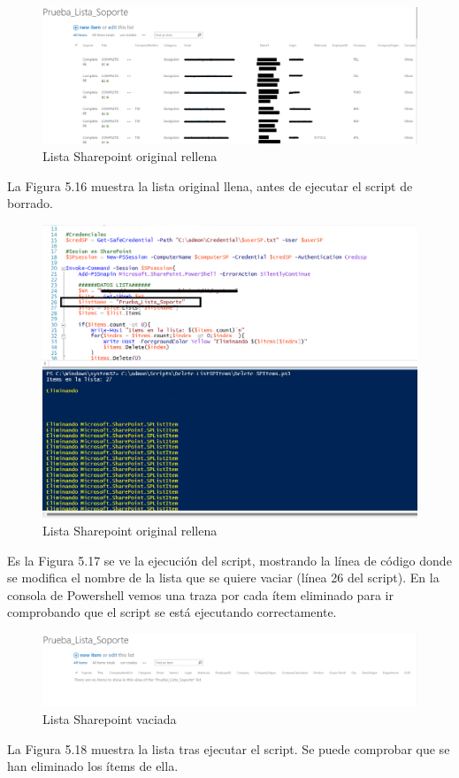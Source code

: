 \documentclass[a4paper, 12pt]{book}
\begin{document}
\begin{itemize}
\begin{figure}[H]
	\centering
	\includegraphics[width=17cm, keepaspectratio]{img/image15.png}
	\caption{Lista Sharepoint original rellena}
	\label{fig:image15}
\end{figure}

La Figura 5.16 muestra la lista original llena, antes de ejecutar el script de borrado.

\begin{figure}[H]
	\centering
	\includegraphics[width=17cm, keepaspectratio]{img/image16.png}
	\caption{Lista Sharepoint original rellena}
	\label{fig:image16}
\end{figure}

Es la Figura 5.17 se ve la ejecución del script, mostrando la línea de código donde se modifica el nombre de la lista que se quiere vaciar (línea 26 del script). En la consola de Powershell vemos una traza por cada ítem eliminado para ir comprobando que el script se está ejecutando correctamente.

\begin{figure}[H]
	\centering
	\includegraphics[width=17cm, keepaspectratio]{img/image12.png}
	\caption{Lista Sharepoint vaciada}
	\label{fig:image12}
\end{figure}

La Figura 5.18 muestra la lista tras ejecutar el script. Se puede comprobar que se han eliminado los ítems de ella.

\end{itemize}
\end{document}
